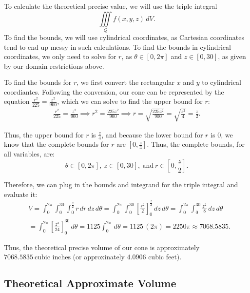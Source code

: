 \documentclass[12pt]{article}
\begin{document}
To calculate the theoretical precise value, we will use the triple integral
\begin{equation*}
    \iiint\limits_{Q} f(x, y, z) \, dV.
\end{equation*}
To find the bounds, we will use cylindrical coordinates, as Cartesian
coordinates tend to end up messy in such calculations. To find the bounds
in cylindrical coordinates, we only need to solve for $r$, as $\theta \in [0,
2\pi]$ and $z \in [0, 30]$, as given by our domain restrictions above.

To find the bounds for $r$, we first convert the rectangular $x$ and $y$
to cylindrical coordiantes. Following the conversion, our cone can be 
represented by the equation $\frac{r^{2}}{225} = \frac{z^{2}}{900}$, which
we can solve to find the upper bound for $r$:
\begin{align*}
    \frac{r^{2}}{225} = \frac{z^{2}}{900} \implies r^{2} = \frac{225z^{2}}{900} \implies r = 
    \sqrt{ \frac{225z^{2}}{900} } = \sqrt{ \frac{z^{2}}{4} } = \frac{z}{2}.
\end{align*}

Thus, the upper bound for $r$ is $\frac{z}{4}$, and because the lower  
bound for $r$ is $0$, we know that the complete bounds for $r$ are $[0,
\frac{z}{4}]$. Thus, the complete bounds, for all variables, are:
\begin{equation*}
    \theta \in \left[ 0, 2\pi \right], \ z \in \left[ 0, 30 \right],  \ \text{and} 
    \ r \in \left[ 0, \frac{z}{2} \right].
\end{equation*}

Therefore, we can plug in the bounds and integrand for the triple integral
and evaluate it:
\begin{align*}
    &V = \int_{0}^{2\pi} \int_{0}^{30} \int_{0}^{\frac{z}{2}} r \, dr  \, dz  \, d\theta
    = \int_{0}^{2\pi} \int_{0}^{30} \left[ \frac{r^{2}}{2} \right]_{0}^{\frac{z}{2}} \, dz  \, d\theta
    = \int_{0}^{2\pi} \int_{0}^{30} \frac{z^{2}}{8} \, dz  \, d\theta \\
    &= \int_{0}^{2\pi} \left[ \frac{z^{3}}{24} \right]_{0}^{30} \, d\theta
    = 1125 \int_{0}^{2\pi} \, d\theta
    = 1125 \, (2\pi)
    = 2250\pi
    \approx 7068.5835.
\end{align*}

Thus, the theoretical precise volume of our cone is approximately $\boxed{
7068.5835 \ \text{cubic inches}}$ (or approxinately $4.0906$ cubic feet).

\subsection{Theoretical Approximate Volume}
\end{document}
